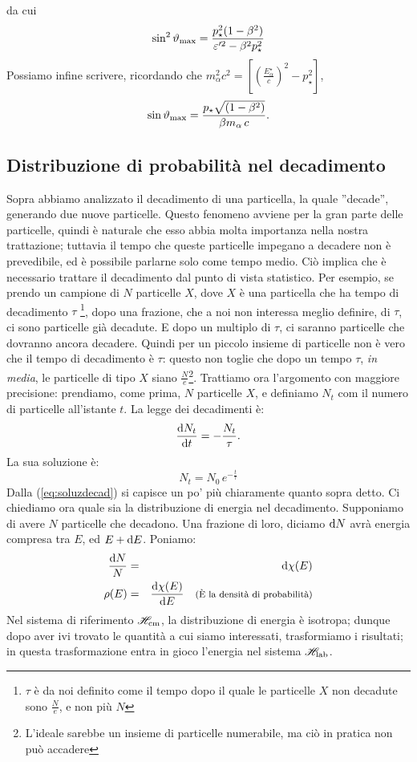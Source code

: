 da cui
$$
\sin^2\vartheta_{\mathrm{max}}=\frac{p_{\star}^2(1-\beta^2)}{\varepsilon'^2-
\beta^2  
p_{\star}^2}
$$
Possiamo inf\mbox{}ine scrivere, ricordando che
$m_{\alpha}^2c^2=\left[\left(\frac{E_{\alpha}^{\star}}{c}\right)^2
- p_{\star}^2\right]$,
$$
\sin\vartheta_{\mathrm{max}}=\frac{p_{\star}\sqrt{(1-\beta^2)}}{\beta
m_{\alpha }\,c}.
$$
\subsection{ Distribuzione di probabilit\`a nel
decadimento} Sopra abbiamo analizzato il decadimento di una
particella, la quale ''decade'', generando due nuove particelle.
Questo fenomeno avviene per la gran parte delle particelle, quindi
\`e naturale che esso abbia molta importanza nella nostra
trattazione; tuttavia il tempo che queste particelle impegano a
decadere non \`e prevedibile, ed \`e possibile parlarne solo come
tempo medio. Ci\`o implica che \`e necessario trattare il
decadimento dal punto di vista statistico. Per esempio, se prendo
un campione di $N$ particelle $X$, dove $X$ \`e una particella che
ha tempo di decadimento $\tau$ \footnote{\hspace{0.1cm} $\tau$ \`e
da noi definito come il tempo dopo il quale le particelle $X$ non
decadute sono $\frac{N}{e}$, e non pi\`u $N$}, dopo una frazione,
che a noi non interessa meglio definire, di $\tau$, ci sono
particelle gi\`a decadute. E dopo un multiplo di $\tau$, ci
saranno particelle che dovranno ancora decadere. Quindi per un
piccolo insieme di particelle non \`e vero che il tempo di
decadimento \`e $\tau$: questo non toglie che dopo un tempo
$\tau$, \emph{in media}, le particelle di tipo $X$ siano
$\frac{N}{e}$\footnote{L'ideale sarebbe un insieme di particelle
numerabile, ma ci\`o in pratica non pu\`o accadere}.
\newline
Trattiamo ora l'argomento con maggiore precisione: prendiamo, come
prima, $N$ particelle $X$, e definiamo $N_t$ com il numero di
particelle all'istante $t$. La legge dei decadimenti \`e:
$$
\frac{\mathrm{d} N_t}{\mathrm{d} t}=-\frac{N_t}{\tau}.
$$
La sua soluzione \`e:
\begin{equation}
N_t=N_0\,e^{-\frac{t}{\tau}} \label{eq:soluzdecad}\end{equation}
Dalla (\ref{eq:soluzdecad}) si capisce un po' pi\`u chiaramente
quanto sopra detto.
\newline
Ci chiediamo ora quale sia la distribuzione di energia
 nel decadimento. Supponiamo di
avere $N$ particelle che decadono. Una frazione di loro, diciamo
$\mathrm{d} N$ avr\`a energia compresa tra $E$, ed $E + \mathrm{d} E$. Poniamo:
\begin{eqnarray*}
\frac{\mathrm{d} N}{N}&=&\mathrm{d} \chi (E)\\ \rho (E)&=&\frac{\mathrm{d} \chi
(E)}{\mathrm{d} E} \quad\mbox{\footnotesize(\`E la densit\`a di
probabilit\`a)}
\end{eqnarray*}
Nel sistema di riferimento $\mathscr{H}_{\mathrm{cm}}$, la distribuzione di energia \`e
isotropa; dunque dopo aver ivi trovato le quantit\`a a cui siamo
interessati, trasformiamo i risultati; in questa trasformazione
entra in gioco l'energia nel sistema $\mathscr{H}_{\mathrm{lab}}$.
\newline


